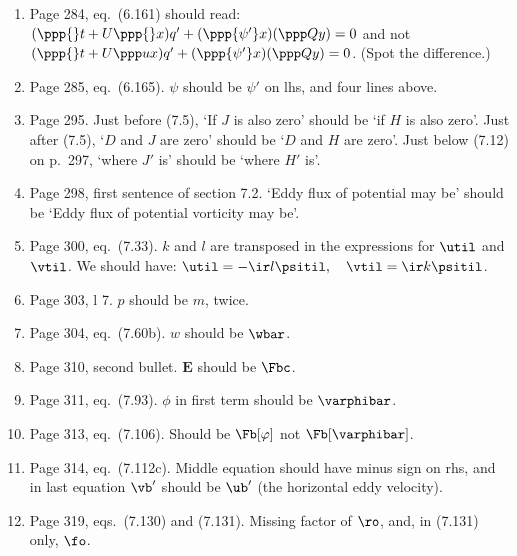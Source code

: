 \documentclass[10pt]{article}
\newcommand{\eq}{eq.\ } \newcommand{\Eq}{Eq.\ }
\begin{document}
\begin{enumerate}

\item Page 284, \eq (6.161) should read: $(\ppp{}t + U \ppp {}  x) q' + (\ppp{\psi'} x)( \ppp Q y) = 0 $ and not $(\ppp{}t + U \ppp u x) q' + (\ppp{\psi'}x) ( \ppp Q y )= 0 $. (Spot the difference.)

\item Page 285, \eq (6.165). $\psi$ should be $\psi'$ on lhs, and four lines above. 
 
\item Page 295. Just before (7.5), `If $J$ is also zero' should be `if $H$ is also zero'. Just after (7.5), `$D$ and $J$ are zero' should be `$D$ and $H$ are zero'. Just below (7.12) on p.\ 297, `where $J'$ is' should be `where $H'$ is'.

\item Page 298, first sentence of section 7.2. `Eddy flux of potential may be' should be `Eddy flux of potential vorticity may be'.

\item Page 300, \eq (7.33). $k$ and $l$ are transposed in the expressions for $\util$ and $\vtil$. We should have:
     $  \util  =  - \ir l \psitil,  \quad \vtil = \ir k \psitil$. 

\item Page 303, l 7. $p$ should be $m$, twice. 

\item Page 304, \eq (7.60b). $w$ should be $\wbar$.

\item Page 310, second bullet. $\bm E$ should be $\Fbc$.

\item Page 311, \eq (7.93). $\phi$ in first term should be $\varphibar$.

\item Page 313, \eq (7.106). Should be $\Fb[\varphi]$ not $\Fb[\varphibar]$.

\item Page 314, \eq (7.112c). Middle equation should have minus sign on rhs, and in last equation $\vb'$ should be $\ub'$ (the horizontal eddy velocity).


\item Page 319, eqs.\ (7.130) and (7.131). Missing factor of $\ro$, and, in (7.131) only, $\fo$.


\end{enumerate}
\end{document}
